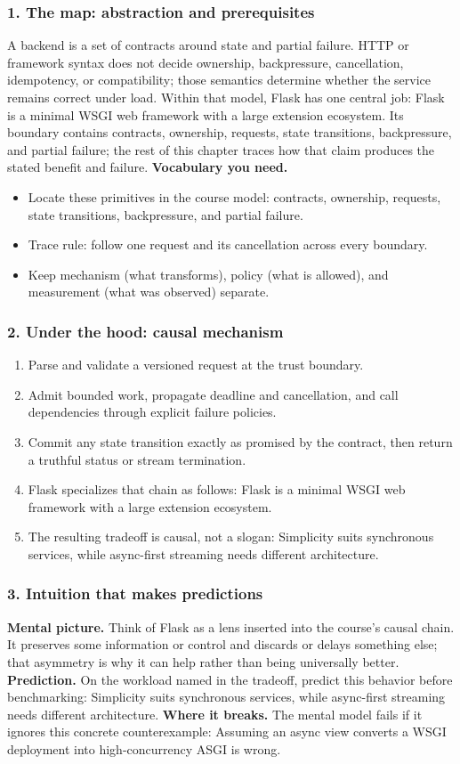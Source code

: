 \subsubsection*{1. The map: abstraction and prerequisites}
A backend is a set of contracts around state and partial failure. HTTP or framework syntax does not decide ownership, backpressure, cancellation, idempotency, or compatibility; those semantics determine whether the service remains correct under load.
Within that model, Flask has one central job: Flask is a minimal WSGI web framework with a large extension ecosystem. Its boundary contains contracts, ownership, requests, state transitions, backpressure, and partial failure; the rest of this chapter traces how that claim produces the stated benefit and failure.
\textbf{Vocabulary you need.}\begin{itemize}
\item Locate these primitives in the course model: contracts, ownership, requests, state transitions, backpressure, and partial failure.
\item Trace rule: follow one request and its cancellation across every boundary.
\item Keep mechanism (what transforms), policy (what is allowed), and measurement (what was observed) separate.
\end{itemize}
\subsubsection*{2. Under the hood: causal mechanism}\begin{enumerate}
\item Parse and validate a versioned request at the trust boundary.
\item Admit bounded work, propagate deadline and cancellation, and call dependencies through explicit failure policies.
\item Commit any state transition exactly as promised by the contract, then return a truthful status or stream termination.
\item Flask specializes that chain as follows: Flask is a minimal WSGI web framework with a large extension ecosystem.
\item The resulting tradeoff is causal, not a slogan: Simplicity suits synchronous services, while async-first streaming needs different architecture.
\end{enumerate}
\subsubsection*{3. Intuition that makes predictions}
\textbf{Mental picture.} Think of Flask as a lens inserted into the course's causal chain. It preserves some information or control and discards or delays something else; that asymmetry is why it can help rather than being universally better.
\textbf{Prediction.} On the workload named in the tradeoff, predict this behavior before benchmarking: Simplicity suits synchronous services, while async-first streaming needs different architecture.
\textbf{Where it breaks.} The mental model fails if it ignores this concrete counterexample: Assuming an async view converts a WSGI deployment into high-concurrency ASGI is wrong.
